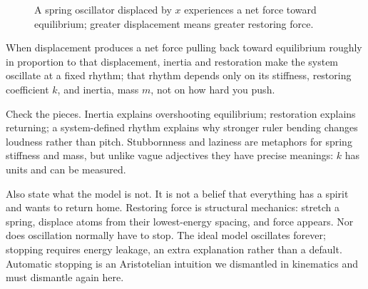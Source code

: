 \begin{figure}[htbp]
\centering
{}
\caption{A spring oscillator displaced by \(x\) experiences a net force toward equilibrium; greater displacement means greater restoring force.}
\end{figure}


\begin{oneline}
When displacement produces a net force pulling back toward equilibrium roughly in proportion to that displacement, inertia and restoration make the system oscillate at a fixed rhythm; that rhythm depends only on its stiffness, restoring coefficient \(k\), and inertia, mass \(m\), not on how hard you push.
\end{oneline}

Check the pieces. Inertia explains overshooting equilibrium; restoration explains returning; a system-defined rhythm explains why stronger ruler bending changes loudness rather than pitch. Stubbornness and laziness are metaphors for spring stiffness and mass, but unlike vague adjectives they have precise meanings: \(k\) has units and can be measured.

Also state what the model is not. It is not a belief that everything has a spirit and wants to return home. Restoring force is structural mechanics: stretch a spring, displace atoms from their lowest-energy spacing, and force appears. Nor does oscillation normally have to stop. The ideal model oscillates forever; stopping requires energy leakage, an extra explanation rather than a default. Automatic stopping is an Aristotelian intuition we dismantled in kinematics and must dismantle again here.


